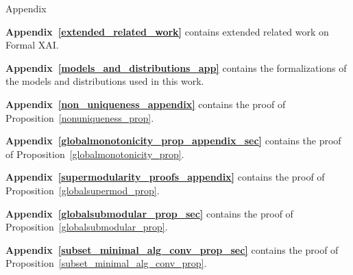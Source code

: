 \documentclass{article}
\begin{document}
\newpage
\appendix
\onecolumn
\appendix


\setcounter{definition}{0}
\setcounter{proposition}{0}
\setcounter{theorem}{0}
\setcounter{lemma}{0}
\begin{center}\begin{huge} Appendix\end{huge}\end{center}    






\begin{MyIndentedList}

    \item 
    \textbf{Appendix~\ref{extended_related_work}} contains extended related work on Formal XAI.

    \item 
    \textbf{Appendix~\ref{models_and_distributions_app}} contains the formalizations of the models and distributions used in this work.
    \item 

    
\textbf{Appendix~\ref{non_uniqueness_appendix}} contains the proof of Proposition~\ref{nonuniqueness_prop}.

    \item 


\textbf{Appendix~\ref{globalmonotonicity_prop_appendix_sec}} contains the proof of Proposition~\ref{globalmonotonicity_prop}.

    \item 

\textbf{Appendix~\ref{supermodularity_proofs_appendix}} contains the proof of Proposition~\ref{globalsupermod_prop}.

    \item 

\textbf{Appendix~\ref{globalsubmodular_prop_sec}} contains the proof of Proposition~\ref{globalsubmodular_prop}.
    \item 


\textbf{Appendix~\ref{subset_minimal_alg_conv_prop_sec}} contains the proof of Proposition~\ref{subset_minimal_alg_conv_prop}.
    
    \item 


\end{MyIndentedList}
\end{document}
